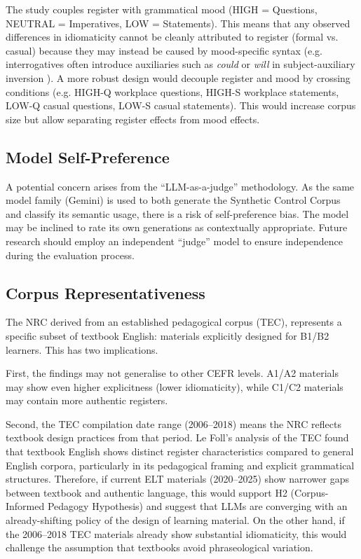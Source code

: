 The study couples register with grammatical mood (HIGH = Questions, NEUTRAL = Imperatives, LOW = Statements). This means that any observed differences in idiomaticity cannot be cleanly attributed to register (formal vs. casual) because they may instead be caused by mood-specific syntax (e.g. interrogatives often introduce auxiliaries such as \textit{could} or \textit{will} in subject-auxiliary inversion \parencite{huddlestonPullumCambridge2002,quirkComprehensiveGrammar1985}). A more robust design would decouple register and mood by crossing conditions (e.g. HIGH-Q workplace questions, HIGH-S workplace statements, LOW-Q casual questions, LOW-S casual statements). This would increase corpus size but allow separating register effects from mood effects.

\subsection{Model Self-Preference}
A potential concern arises from the ``LLM-as-a-judge'' methodology. As the same model family (Gemini) is used to both generate the Synthetic Control Corpus and classify its semantic usage, there is a risk of self-preference bias. The model may be inclined to rate its own generations as contextually appropriate. Future research should employ an independent ``judge'' model to ensure independence during the evaluation process.

\subsection{Corpus Representativeness}

The NRC derived from an established pedagogical corpus (TEC), represents a specific subset of textbook English: materials explicitly designed for B1/B2 learners. This has two implications.

First, the findings may not generalise to other CEFR levels. A1/A2 materials may show even higher explicitness (lower idiomaticity), while C1/C2 materials may contain more authentic registers.

Second, the TEC compilation date range (2006--2018) means the NRC reflects textbook design practices from that period. Le Foll's \parencite*{leFoll2021b} analysis of the TEC found that textbook English shows distinct register characteristics compared to general English corpora, particularly in its pedagogical framing and explicit grammatical structures. Therefore, if current ELT materials (2020--2025) show narrower gaps between textbook and authentic language, this would support H2 (Corpus-Informed Pedagogy Hypothesis) and suggest that LLMs are converging with an already-shifting policy of the design of learning material. On the other hand, if the 2006--2018 TEC materials already show substantial idiomaticity, this would challenge the assumption that textbooks avoid phraseological variation.

